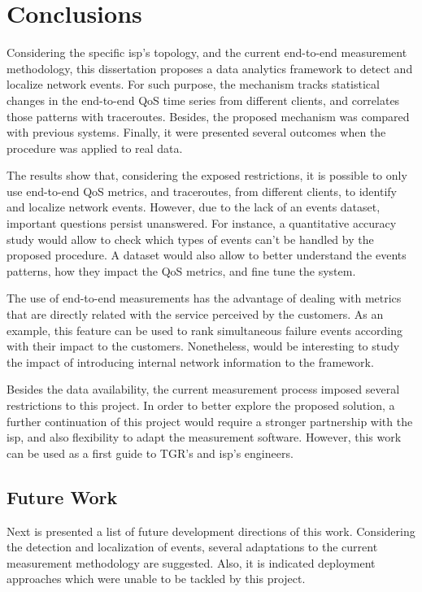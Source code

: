 \chapter{Conclusions}
\label{chap:conclusion}

Considering the specific \gls*{isp}'s topology, and the current end-to-end measurement
methodology, this dissertation proposes a data analytics framework to
detect and localize network events.
For such purpose, the mechanism tracks
statistical changes in the end-to-end QoS time series from different clients,
and correlates those patterns with traceroutes.
Besides, the proposed mechanism was compared with previous systems.
Finally, it were presented several outcomes when the procedure was applied to
real data.

The results show that, considering the exposed restrictions,
it is possible to only use end-to-end QoS metrics, and traceroutes, from
different clients, to identify and localize network events.
However, due to the lack of an events dataset, important
questions persist unanswered.
For instance, a quantitative accuracy study
would allow to check which types of events can't be handled by the
proposed procedure.
A dataset would also allow to better understand the events
patterns, how they impact the QoS metrics, and fine tune the system.

The use of end-to-end measurements has the advantage of dealing with
metrics that are directly related with the service perceived by the customers.
As an example, this feature can be used to rank simultaneous failure events
according with their impact to the customers.
Nonetheless, would be interesting to study the impact of introducing
internal network information to the framework.

Besides the data availability, the current measurement process imposed
several restrictions to this project.
In order to better explore the proposed solution,
a further continuation of this project
would require a stronger partnership with the \gls*{isp},
and also flexibility to adapt the measurement software.
However, this work can be used as a first guide to TGR's and \gls*{isp}'s engineers.

\section{Future Work}

Next is presented a list of future development directions of this work.
Considering the detection and localization of events, several adaptations to
the current measurement methodology are suggested.
Also, it is indicated deployment approaches which
were unable to be tackled by this project.

